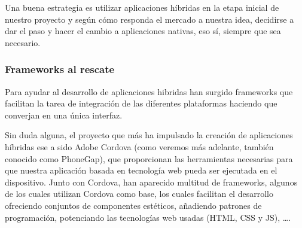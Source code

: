 Una buena estrategia es utilizar aplicaciones híbridas en la etapa inicial de nuestro proyecto y según cómo responda el mercado a nuestra idea, decidirse a dar el paso y hacer el cambio a aplicaciones nativas, eso sí, siempre que sea necesario.

\subsubsection{Frameworks al rescate}

Para ayudar al desarrollo de aplicaciones hibridas han surgido frameworks que facilitan la tarea de integración de las diferentes plataformas haciendo que converjan en una única interfaz.

Sin duda alguna, el proyecto que más ha impulsado la creación de aplicaciones híbridas  ese a sido Adobe Cordova (como veremos más adelante, también conocido como PhoneGap), que proporcionan las herramientas necesarias para que nuestra aplicación basada en tecnología web pueda ser ejecutada en el dispositivo. Junto con Cordova, han aparecido multitud de frameworks, algunos de los cuales utilizan Cordova como base, los cuales facilitan el desarrollo ofreciendo conjuntos de componentes estéticos, añadiendo patrones de programación, potenciando las tecnologías web usadas (\gls{HTML}, \gls{CSS} y \gls{JS}), \ldots.
